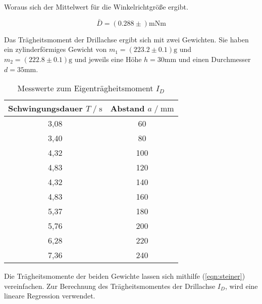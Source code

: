 Woraus sich der Mittelwert für die Winkelrichtgröße ergibt.

\begin{equation}
  \bar D = (0.288\pm) \si{\milli\newton\meter}
\end{equation}

Das Trägheitsmoment der Drillachse ergibt sich mit zwei Gewichten.
Sie haben ein zylinderförmiges Gewicht von $m_1 = (223.2 \pm 0.1) \text{g}$ und $m_2 = (222.8 \pm 0.1) \text{g}$ und jeweils eine
Höhe $h=30\si{\milli\meter}$ und einen Durchmesser $d=35\si{\milli\meter}$.

\begin{table}
  \centering
   \caption{Messwerte zum Eigenträgheitsmoment $I_D$}
   \label{tab:eigentraegheitmess}
   \begin{tabular}{c c}
       \toprule
       Schwingungsdauer $ T \;/\; \si{\second}$ & Abstand $a \;/\; \si{\milli\meter}$ \\
       \midrule
       3,08 & 60 \\
       3,40 & 80 \\
       4,32 & 100 \\
       4,83 & 120 \\
       4,32 & 140 \\
       4,83 & 160 \\
       5,37 & 180 \\
       5,76 & 200 \\
       6,28 & 220 \\
       7,36 & 240 \\
       \bottomrule
   \end{tabular}
\end{table}





Die Trägheitsmomente der beiden Gewichte lassen sich mithilfe (\autoref{eqn:steiner}) vereinfachen. Zur Berechnung
des Trägheitsmomentes der Drillachse $I_D$, wird eine lineare Regression verwendet.

